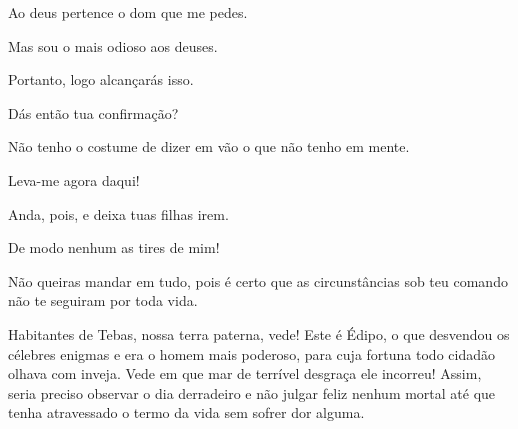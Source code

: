    Ao deus pertence o dom que me pedes.

   Mas sou o mais odioso aos deuses.

   Portanto, logo alcançarás isso.

   Dás então tua confirmação?

   Não tenho o costume de dizer em vão o que não tenho em mente.

   Leva-me agora daqui!

   Anda, pois, e deixa tuas filhas irem.

   De modo nenhum as tires de mim!

   Não queiras mandar em tudo, pois é certo que as circunstâncias sob teu
comando não te seguiram por toda vida.


   Habitantes de Tebas, nossa terra paterna, vede! Este é Édipo, o que
desvendou os célebres enigmas e era o homem mais poderoso, para cuja
fortuna todo cidadão olhava com inveja. Vede em que mar de terrível
desgraça ele incorreu! Assim, seria preciso observar o dia derradeiro e
não julgar feliz nenhum mortal até que tenha atravessado o termo
da vida sem sofrer dor alguma.

\endgroup %



